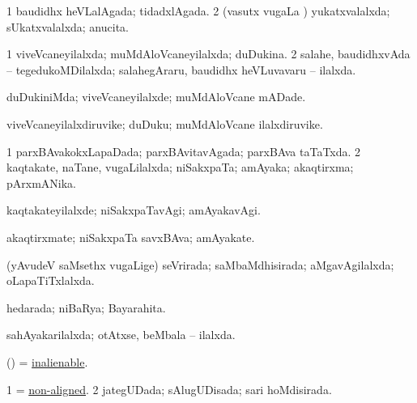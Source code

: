 \bentry
{} 
\gl{\gu}
\expl{}
\bmng
\bnum
\num{1} baudidhx heVLalAgada; tidadxlAgada. 
\num{2} (vasutx \mo vugaLa \vi) yukatxvalalxda; sUkatxvalalxda; anucita. 
\enum
\emng
\eentry

\bentry
{} 
\gl{\gu}
\expl{}
\bmng
\bnum
\num{1} viveVcaneyilalxda; muMdAloVcaneyilalxda; duDukina. 
\num{2} salahe, baudidhxvAda -- tegedukoMDilalxda; salahegAraru, baudidhx heVLuvavaru -- ilalxda. 
\enum
\emng
\eentry

\bentry
{} 
\gl{\kirxvi}
\expl{}
\bmng
duDukiniMda; viveVcaneyilalxde; muMdAloVcane mADade. 
\emng
\eentry

\bentry
{} 
\gl{\nA}
\expl{}
\bmng
viveVcaneyilalxdiruvike; duDuku; muMdAloVcane ilalxdiruvike. 
\emng
\eentry

\bentry
{} 
\gl{\gu}
\expl{}
\bmng
\bnum
\num{1} parxBAvakokxLapaDada; parxBAvitavAgada; parxBAva taTaTxda. 
\num{2} kaqtakate, naTane, \mo vugaLilalxda; niSakxpaTa; amAyaka; akaqtirxma; pArxmANika. 
\enum
\emng
\eentry

\bentry
{} 
\gl{\kirxvi}
\expl{}
\bmng
kaqtakateyilalxde; niSakxpaTavAgi; amAyakavAgi. 
\emng
\eentry

\bentry
{} 
\gl{\nA}
\expl{}
\bmng
akaqtirxmate; niSakxpaTa savxBAva; amAyakate. 
\emng
\eentry

\bentry
{} 
\gl{\gu}
\expl{}
\bmng
(yAvudeV saMsethx \mo vugaLige) seVrirada; saMbaMdhisirada; aMgavAgilalxda; oLapaTiTxlalxda. 
\emng
\eentry

\bentry
{} 
\gl{\gu}
\expl{}
\bmng
hedarada; niBaRya; Bayarahita. 
\emng
\eentry

\bentry
{} 
\gl{\gu}
\expl{}
\bmng
sahAyakarilalxda; otAtxse, beMbala -- ilalxda. 
\emng
\eentry

\bentry
{} 
\gl{\gu}
\expl{}
\bmng
(\nAyxshA) = \hyperref{kandict_i.pdf}{I}{inalienable}{inalienable}. 
\emng
\eentry

\bentry
{} 
\gl{\gu}
\expl{}
\bmng
\bnum
\num{1} = \hyperref{kandict_n.pdf}{N}{non-aligned}{non-aligned}. 
\num{2} jategUDada; sAlugUDisada; sari hoMdisirada. 
\enum
\emng
\eentry

